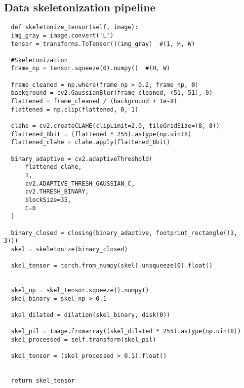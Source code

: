 \documentclass[a4paper,12pt]{article}
\begin{document}
\hypertarget{sec:optim}{\subsection{Data skeletonization pipeline}}

\label{app:optim}
\begin{lstlisting}
  def skeletonize_tensor(self, image):
  img_gray = image.convert('L')
  tensor = transforms.ToTensor()(img_gray)  #(1, H, W)

  #Skeletonization
  frame_np = tensor.squeeze(0).numpy()  #(H, W)

  frame_cleaned = np.where(frame_np > 0.2, frame_np, 0)
  background = cv2.GaussianBlur(frame_cleaned, (51, 51), 0)
  flattened = frame_cleaned / (background + 1e-8)
  flattened = np.clip(flattened, 0, 1)

  clahe = cv2.createCLAHE(clipLimit=2.0, tileGridSize=(8, 8))
  flattened_8bit = (flattened * 255).astype(np.uint8)
  flattened_clahe = clahe.apply(flattened_8bit)

  binary_adaptive = cv2.adaptiveThreshold(
      flattened_clahe,
      1,
      cv2.ADAPTIVE_THRESH_GAUSSIAN_C,
      cv2.THRESH_BINARY,
      blockSize=35,
      C=0
  )

  binary_closed = closing(binary_adaptive, footprint_rectangle((3, 3)))
  skel = skeletonize(binary_closed)

  skel_tensor = torch.from_numpy(skel).unsqueeze(0).float()

  
  skel_np = skel_tensor.squeeze().numpy()
  skel_binary = skel_np > 0.1

  skel_dilated = dilation(skel_binary, disk(0))

  skel_pil = Image.fromarray((skel_dilated * 255).astype(np.uint8))
  skel_processed = self.transform(skel_pil)

  skel_tensor = (skel_processed > 0.1).float()


  return skel_tensor
\end{lstlisting}




\end{document}
